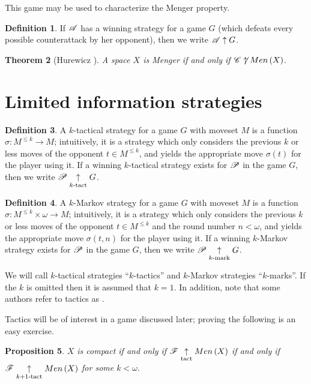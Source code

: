 \documentclass{amsart}
\newtheorem{theorem}{Theorem}[section]
\newtheorem{proposition}[theorem]{Proposition}
\theoremstyle{definition}
\newtheorem{definition}[theorem]{Definition}
\begin{document}
This game may be used to characterize the Menger property.

\begin{definition}
  If \(\mathscr{A}\) has a winning strategy for a game \(G\) (which defeats every
  possible counterattack by her opponent), then we write \(\mathscr{A}\uparrow G\).
\end{definition}

\begin{theorem}[Hurewicz \cite{MR1544773}]
  A space \(X\) is Menger if and only if \(\mathscr{C}\not\uparrow Men\left({X}\right)\).
\end{theorem}


\section{Limited information strategies}

\begin{definition}
  A \(k\)-tactical strategy for a game \(G\) with moveset \(M\) is a function
  \(\sigma:M^{\leq k}\to M\); intuitively, it is a strategy which only considers
  the previous \(k\) or less moves of the opponent \(t\in M^{\leq k}\), and yields
  the appropriate move \(\sigma(t)\) for the player using it.
  If a winning \(k\)-tactical strategy
  exists for \(\mathscr{P}\) in the game \(G\), then we write \(\mathscr{P}\underset{k\text{-tact}}{\uparrow} G\).
\end{definition}

\begin{definition}
  A \(k\)-Markov strategy for a game \(G\) with moveset \(M\) is a function
  \(\sigma:M^{\leq k}\times\omega\to M\); intuitively, it is a strategy which
  only considers the previous \(k\) or less moves of the opponent
  \(t\in M^{\leq k}\) and the round number \(n<\omega\),
  and yields the appropriate move \(\sigma(t,n)\) for the player using it.
  If a winning \(k\)-Markov strategy exists for
  \(\mathscr{P}\) in the game \(G\), then we write \(\mathscr{P}\underset{k\text{-mark}}{\uparrow} G\).
\end{definition}

We will call \(k\)-tactical strategies ``\(k\)-tactics'' and \(k\)-Markov strategies
``\(k\)-marks''. If the \(k\) is omitted then it is assumed that \(k=1\). In
addition, note that some authors refer to tactics as
.

Tactics will be of interest in a game discussed later; proving
the following is an easy exercise.

\begin{proposition}
  \(X\) is compact if and only if
  \(\mathscr{F} \underset{\text{tact}}{\uparrow} Men\left({X}\right)\) if and only if
  \(\mathscr{F} \underset{k+1\text{-tact}}{\uparrow} Men\left({X}\right)\) for some \(k<\omega\).
\end{proposition}
\end{document}

